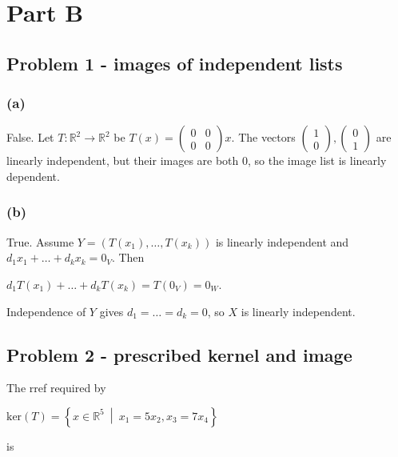 \section{Part B}

\subsection{Problem 1 - images of independent lists}

\subsubsection{(a)}

False. Let \(T:\mathbb{R}^{2}\rightarrow\mathbb{R}^{2}\) be \(T(x) = \begin{pmatrix}
0 & 0 \\
0 & 0
\end{pmatrix}x\). The vectors \(\begin{pmatrix}
1 \\
0
\end{pmatrix},\begin{pmatrix}
0 \\
1
\end{pmatrix}\) are linearly independent, but their images are both \(0\), so the image list is linearly dependent.

\subsubsection{(b)}

True. Assume \(Y = \left( {T\left( x_{1} \right),\ldots,T\left( x_{k} \right)} \right)\) is linearly independent and \(d_{1}x_{1} + \ldots + d_{k}x_{k} = 0_{V}\). Then

\(d_{1}T\left( x_{1} \right) + \ldots + d_{k}T\left( x_{k} \right) = T\left( 0_{V} \right) = 0_{W}.\)

Independence of \(Y\) gives \(d_{1} = \ldots = d_{k} = 0\), so \(X\) is linearly independent.

\subsection{Problem 2 - prescribed kernel and image}

The rref required by

\(\text{ker}(T) = \left\{ x \in \mathbb{R}^{5}\  \middle| \ x_{1} = 5x_{2},x_{3} = 7x_{4} \right\}\)

is

